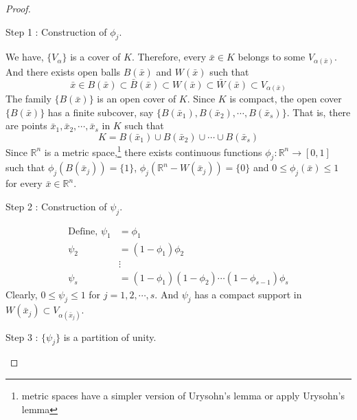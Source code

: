 \begin{proof}
	\begin{commentary}
		Step 1 : Construction of $\phi_j$.
	\end{commentary}

	We have, $\{ V_\alpha \}$ is a cover of $K$.
	Therefore, every $\bar{x} \in K$ belongs to some $V_{\alpha(\bar{x})}$.
	And there exists open balls $B(\bar{x})$ and $W(\bar{x})$ such that
	\begin{equation}
		\bar{x} \in B(\bar{x}) \subset \bar{B}(\bar{x}) \subset W(\bar{x}) \subset \bar{W}(\bar{x}) \subset V_{\alpha(\bar{x})}
	\end{equation}
	The family $\{ B(\bar{x}) \}$ is an open cover of $K$.
	Since $K$ is compact, the open cover $\{ B(\bar{x}) \}$ has a finite subcover, say $\{ B(\bar{x}_1),B(\bar{x}_2),\cdots,B(\bar{x}_s) \}$.
	That is, there are points $\bar{x}_1,\bar{x}_2,\cdots,\bar{x}_s$ in $K$ such that
	\begin{equation}
		K = B(\bar{x}_1) \cup B(\bar{x}_2) \cup \cdots \cup B(\bar{x}_s)
	\end{equation}
	Since $\mathbb{R}^n$ is a metric space,\footnote{metric spaces have a simpler version of Urysohn's lemma or apply Urysohn's lemma}
	there exists continuous functions $\phi_j : \mathbb{R}^n \to [0,1]$
	such that $\phi_j(B(\bar{x}_j)) = \{1\}$,
	$\phi_j(\mathbb{R}^n-W(\bar{x}_j)) = \{0\}$ and
	$0 \le \phi_j(\bar{x}) \le 1$ for every $\bar{x} \in \mathbb{R}^n$.\\
	\begin{commentary}
		Step 2 : Construction of $\psi_j$.
	\end{commentary}
	\begin{align*}
		\text{Define, } \psi_1 & = \phi_1 \\
		\psi_2 & = (1-\phi_1)\phi_2\\
		& \vdots\\
		\psi_s & = (1-\phi_1)(1-\phi_2)\cdots(1-\phi_{s-1})\phi_s
	\end{align*}
	Clearly, $0 \le \psi_j \le 1$ for $j = 1,2,\cdots,s$.
	And $\psi_j$ has a compact support in $W(\bar{x}_j) \subset V_{\alpha(\bar{x}_j)}$.\\
	\begin{commentary}
		Step 3 : $\{\psi_j\}$ is a partition of unity.
	\end{commentary}


\end{proof}
